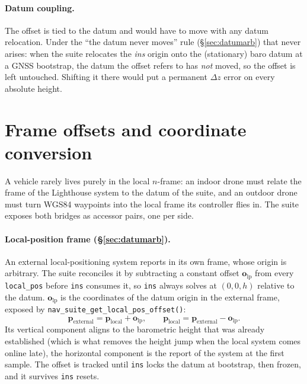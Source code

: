 \documentclass[11pt,a4paper]{article}
\newcommand{\vect}[1]{\bm{#1}}
\newcommand{\code}[1]{\texttt{#1}}
\begin{document}
\paragraph{Datum coupling.} The offset is tied to the datum and would have to
move with any datum relocation. Under the ``the datum never moves'' rule
(\S\ref{sec:datumarb}) that never arises: when the suite relocates the
\emph{ins} origin onto the (stationary) baro datum at a GNSS bootstrap, the
datum the offset refers to has \emph{not} moved, so the offset is left
untouched. Shifting it there would put a permanent $\Delta z$ error on every
absolute height.

\section{Frame offsets and coordinate conversion}
\label{sec:frameoffsets}

A vehicle rarely lives purely in the local $n$-frame: an indoor drone
must relate the frame of the Lighthouse system to the datum of the suite, and an
outdoor drone must turn WGS84 waypoints into the local frame its
controller flies in. The suite exposes both bridges as accessor pairs,
one per side.

\paragraph{Local-position frame (\S\ref{sec:datumarb}).} An external
local-positioning system reports in its own frame, whose origin is
arbitrary. The suite reconciles it by subtracting a constant offset
$\vect{o}_{\text{lp}}$ from every \code{local\_\allowbreak{}pos} before \code{ins}
consumes it, so \code{ins} always solves at $(0,0,h)$ relative to the
datum. $\vect{o}_{\text{lp}}$ is the coordinates of the
datum origin in the external frame, exposed by
\code{nav\_\allowbreak{}suite\_\allowbreak{}get\_\allowbreak{}local\_\allowbreak{}pos\_\allowbreak{}offset()}:
\begin{equation}
  \vect{p}_{\text{external}} = \vect{p}_{\text{local}} + \vect{o}_{\text{lp}},
  \qquad
  \vect{p}_{\text{local}} = \vect{p}_{\text{external}} - \vect{o}_{\text{lp}} .
\end{equation}
Its vertical component aligns to the barometric height that was already
established (which is what removes the height jump when the local system
comes online late), the horizontal component is the report of the system at the
first sample. The offset is tracked until \code{ins} locks the datum at
bootstrap, then frozen, and it survives \code{ins} resets.
\end{document}
